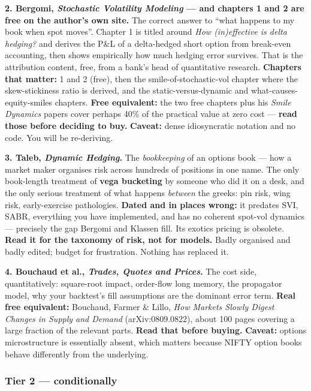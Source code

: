 \documentclass[11pt,a4paper]{article}
\begin{document}
\textbf{2. Bergomi, \emph{Stochastic Volatility Modeling} --- and chapters 1 and 2
are free on the author's own site.} The correct answer to ``what happens to my book
when spot moves''. Chapter 1 is titled around \emph{How (in)effective is delta
hedging?} and derives the P\&L of a delta-hedged short option from break-even
accounting, then shows empirically how much hedging error survives. That is the
attribution content, free, from a bank's head of quantitative research.
\textbf{Chapters that matter:} 1 and 2 (free), then the smile-of-stochastic-vol
chapter where the skew-stickiness ratio is derived, and the static-versus-dynamic
and what-causes-equity-smiles chapters. \textbf{Free equivalent:} the two free
chapters plus his \emph{Smile Dynamics} papers cover perhaps 40\% of the practical
value at zero cost --- \textbf{read those before deciding to buy.} \textbf{Caveat:}
dense idiosyncratic notation and no code. You will be re-deriving.

\textbf{3. Taleb, \emph{Dynamic Hedging}.} The \emph{bookkeeping} of an options
book --- how a market maker organises risk across hundreds of positions in one
name. The only book-length treatment of \textbf{vega bucketing} by someone who did
it on a desk, and the only serious treatment of what happens \emph{between} the
greeks: pin risk, wing risk, early-exercise pathologies. \textbf{Dated and in
places wrong:} it predates SVI, SABR, everything you have implemented, and has no
coherent spot-vol dynamics --- precisely the gap Bergomi and Klassen fill. Its
exotics pricing is obsolete. \textbf{Read it for the taxonomy of risk, not for
models.} Badly organised and badly edited; budget for frustration. Nothing has
replaced it.

\textbf{4. Bouchaud et al., \emph{Trades, Quotes and Prices}.} The cost side,
quantitatively: square-root impact, order-flow long memory, the propagator model,
why your backtest's fill assumptions are the dominant error term. \textbf{Real free
equivalent:} Bouchaud, Farmer \& Lillo, \emph{How Markets Slowly Digest Changes in
Supply and Demand} (arXiv:0809.0822), about 100 pages covering a large fraction of
the relevant parts. \textbf{Read that before buying.} \textbf{Caveat:} options
microstructure is essentially absent, which matters because NIFTY option books
behave differently from the underlying.

\subsubsection{Tier 2 --- conditionally}
\end{document}
